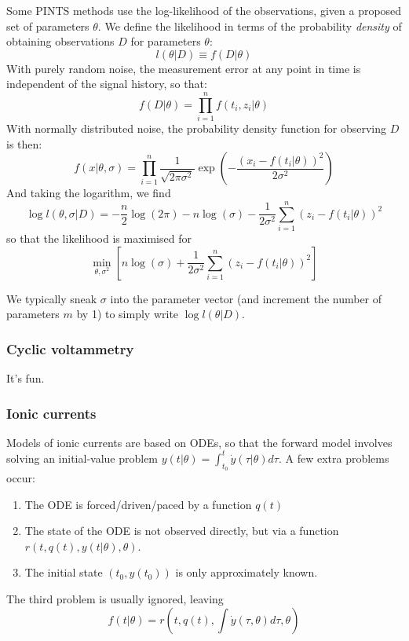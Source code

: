\documentclass[preprint,authoryear,12pt]{elsarticle}
\begin{document}
Some PINTS methods use the log-likelihood of the observations, given a proposed
 set of parameters $\theta$.
We define the likelihood in terms of the probability \emph{density} of
 obtaining observations $D$ for parameters $\theta$:
\begin{equation}
l(\theta|D) \equiv f(D|\theta)
\end{equation}
With purely random noise, the measurement error at any point in time is
 independent of the signal history, so that:
\begin{equation}
f(D|\theta) = \prod_{i=1}^{n} f(t_i,z_i|\theta)
\end{equation}
With normally distributed noise, the probability density function for
 observing $D$ is then:
\begin{equation}
f(x|\theta,\sigma) = \prod_{i=1}^{n} \frac{1}{\sqrt{2\pi\sigma^2}}
    \exp \left(
        -\frac{\left(x_i - f(t_i|\theta)\right)^2}{2\sigma^2}
    \right)
\end{equation}
And taking the logarithm, we find
\begin{equation}
\log l(\theta,\sigma|D) =
    - \frac{n}{2} \log(2\pi)
    - n \log(\sigma)
    - \frac{1}{2\sigma^2} \sum_{i=1}^n \left(z_i - f(t_i|\theta) \right)^2
\end{equation}
so that the likelihood is maximised for
\begin{equation}
\min_{ \theta, \sigma^2 }
    \left[
        n \log(\sigma)
        + \frac{1}{2\sigma^2} \sum_{i=1}^n \left(z_i - f(t_i|\theta) \right)^2
    \right]
\end{equation}

We typically sneak $\sigma$ into the parameter vector (and increment the
 number of parameters $m$ by 1) to simply write $\log l(\theta|D)$.

\subsubsection{Cyclic voltammetry}

It's fun.
 

\subsubsection{Ionic currents}

Models of ionic currents are based on ODEs, so that the forward model involves
 solving an initial-value problem
 $y(t|\theta) = \int_{t_0}^t \dot{y}(\tau|\theta)d\tau$.
A few extra problems occur:
\begin{enumerate}
\item The ODE is forced/driven/paced by a function $q(t)$
\item The state of the ODE is not observed directly, but via a function
 $r(t, q(t), y(t|\theta), \theta)$.
\item The initial state $(t_0, y(t_0))$ is only approximately known.
\end{enumerate}
The third problem is usually ignored, leaving
\begin{equation}
f(t|\theta) = r(t, q(t), \int\dot{y}(\tau, \theta)d\tau, \theta)
\end{equation}
\end{document}
